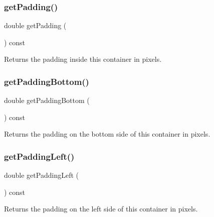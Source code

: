 \subsubsection{\texorpdfstring{get\+Padding()}{getPadding()}}
{\footnotesize\ttfamily double get\+Padding (\begin{DoxyParamCaption}{ }\end{DoxyParamCaption}) const\hspace{0.3cm}{\ttfamily [virtual]}}



Returns the padding inside this container in pixels. 

\mbox{\label{classGContainer_a5696e2debbbafb717c0d47e069b896e4}} 
\subsubsection{\texorpdfstring{get\+Padding\+Bottom()}{getPaddingBottom()}}
{\footnotesize\ttfamily double get\+Padding\+Bottom (\begin{DoxyParamCaption}{ }\end{DoxyParamCaption}) const\hspace{0.3cm}{\ttfamily [virtual]}}



Returns the padding on the bottom side of this container in pixels. 

\mbox{\label{classGContainer_af28748a6467a4d3337788578522fa8f4}} 
\subsubsection{\texorpdfstring{get\+Padding\+Left()}{getPaddingLeft()}}
{\footnotesize\ttfamily double get\+Padding\+Left (\begin{DoxyParamCaption}{ }\end{DoxyParamCaption}) const\hspace{0.3cm}{\ttfamily [virtual]}}



Returns the padding on the left side of this container in pixels. 

